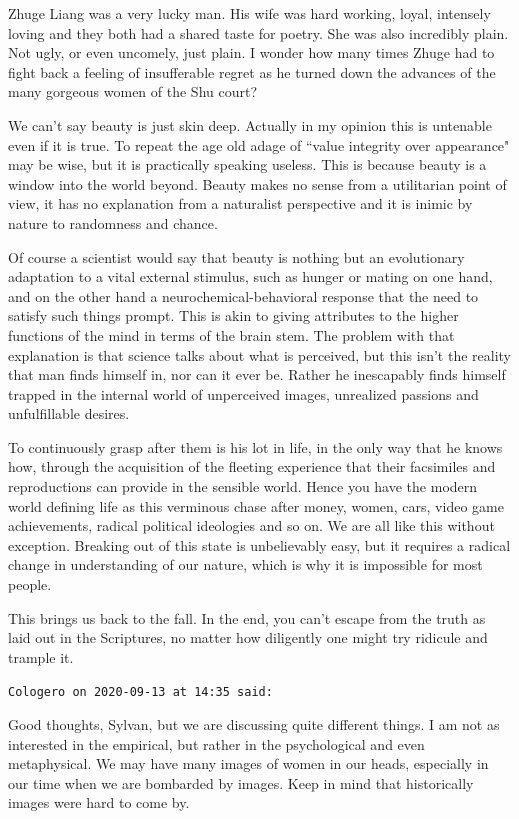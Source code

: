 \begin{footnotesize}
\begin{sffamily}
Zhuge Liang was a very lucky man. His wife was hard working, loyal, intensely loving and they both had a shared taste for poetry. She was also incredibly plain. Not ugly, or even uncomely, just plain. I wonder how many times Zhuge had to fight back a feeling of insufferable regret as he turned down the advances of the many gorgeous women of the Shu court?

We can't say beauty is just skin deep. Actually in my opinion this is untenable even if it is true. To repeat the age old adage of ``value integrity over appearance" may be wise, but it is practically speaking useless. This is because beauty is a window into the world beyond. Beauty makes no sense from a utilitarian point of view, it has no explanation from a naturalist perspective and it is inimic by nature to randomness and chance.

Of course a scientist would say that beauty is nothing but an evolutionary adaptation to a vital external stimulus, such as hunger or mating on one hand, and on the other hand a neurochemical-behavioral response that the need to satisfy such things prompt. This is akin to giving attributes to the higher functions of the mind in terms of the brain stem. The problem with that explanation is that science talks about what is perceived, but this isn't the reality that man finds himself in, nor can it ever be. Rather he inescapably finds himself trapped in the internal world of unperceived images, unrealized passions and unfulfillable desires. 

To continuously grasp after them is his lot in life, in the only way that he knows how, through the acquisition of the fleeting experience that their facsimiles and reproductions can provide in the sensible world. Hence you have the modern world defining life as this verminous chase after money, women, cars, video game achievements, radical political ideologies and so on. We are all like this without exception. Breaking out of this state is unbelievably easy, but it requires a radical change in understanding of our nature, which is why it is impossible for most people. 

This brings us back to the fall. In the end, you can't escape from the truth as laid out in the Scriptures, no matter how diligently one might try ridicule and trample it.


\hfill

\texttt{Cologero on 2020-09-13 at 14:35 said: }

Good thoughts, Sylvan, but we are discussing quite different things. I am not as interested in the empirical, but rather in the psychological and even metaphysical. We may have many images of women in our heads, especially in our time when we are bombarded by images. Keep in mind that historically images were hard to come by.


\end{sffamily}
\end{footnotesize}
